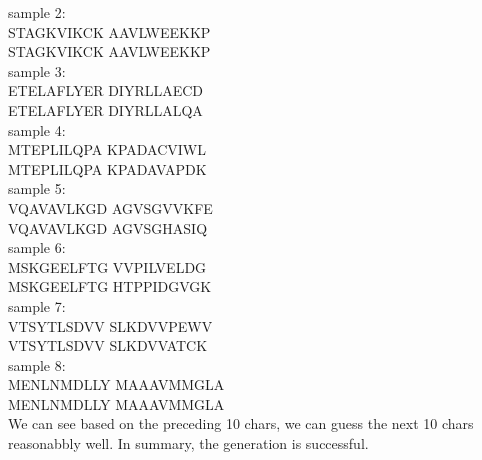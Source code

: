 \documentclass[12pt]{article}
\begin{document}
sample 2:\\
STAGKVIKCK AAVLWEEKKP\\
STAGKVIKCK AAVLWEEKKP\\

sample 3:\\
ETELAFLYER DIYRLLAECD\\
ETELAFLYER DIYRLLALQA\\

sample 4:\\
MTEPLILQPA KPADACVIWL\\
MTEPLILQPA KPADAVAPDK\\

sample 5:\\
VQAVAVLKGD AGVSGVVKFE\\
VQAVAVLKGD AGVSGHASIQ\\

sample 6:\\
MSKGEELFTG VVPILVELDG\\
MSKGEELFTG HTPPIDGVGK\\

sample 7:\\
VTSYTLSDVV SLKDVVPEWV\\
VTSYTLSDVV SLKDVVATCK\\

sample 8:\\
MENLNMDLLY MAAAVMMGLA\\
MENLNMDLLY MAAAVMMGLA\\
We can see based on the preceding 10 chars, we can guess the next
10 chars reasonabbly well. In summary, the generation is successful.\\
\end{document}
